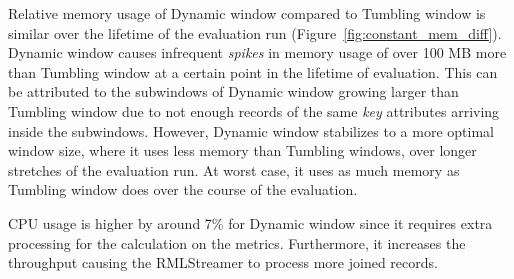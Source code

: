 Relative memory usage of Dynamic window compared to Tumbling window is similar over the lifetime of the 
evaluation run (Figure~\ref{fig:constant_mem_diff}). Dynamic window causes infrequent \emph{spikes} in memory usage of over
 100 MB more than Tumbling window at a certain point in the lifetime of evaluation. This can be attributed 
to the subwindows of Dynamic window growing larger than Tumbling window due to not enough records of the same 
\emph{key} attributes arriving inside the subwindows. However, Dynamic window stabilizes to a more optimal 
window size, where it uses less memory than Tumbling windows, over longer stretches of the evaluation run. At worst case, 
it uses as much memory as Tumbling window does over the course of the evaluation. 

CPU usage is higher by around 7\% for Dynamic window since it requires extra processing 
for the calculation on the metrics.
Furthermore, it increases the throughput causing the RMLStreamer to process 
more joined records. 

